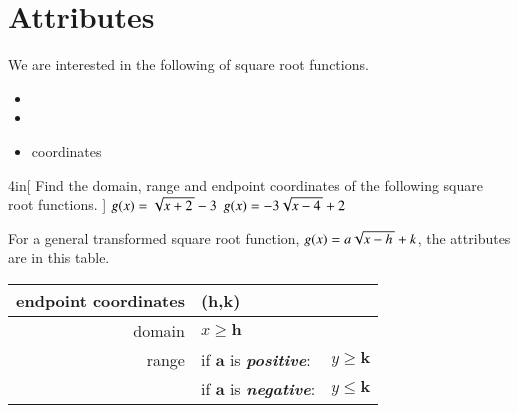 \section{Attributes}

We are interested in the following  of square root functions.
\begin{itemize}[nosep]
    \item {}
    \item {}
    \item {} coordinates
\end{itemize}

\begin{my2Problems}[\normalsize]{4in}[
    Find the domain, range and endpoint coordinates of the 
    following square root functions.
    ]
    {
        $g(x) = \myRoot{x+2} - 3$
    }
    {
        $g(x) = - 3 \myRoot{x-4} + 2$
    }
\end{my2Problems}

For a general transformed square root function,
$g(x) = a \myRoot{x-h} + k$, 
the attributes 
are in this table.

\begin{myCenteredBox}[width=5.25in,]
\Large
\begin{center}
\begin{tabular}{r||lc}
    endpoint coordinates & (${\boldsymbol h}$,${\boldsymbol k}$) &  \\
    \midrule
    domain               & $x \geq {\boldsymbol h}$ &  \\
    \midrule
    range                & if ${\boldsymbol a}$ is {\bfseries\itshape positive}: & $y \geq {\boldsymbol k}$ \\
                         & if ${\boldsymbol a}$ is {\bfseries\itshape negative}: & $y \leq {\boldsymbol k}$ \\
\end{tabular}
\end{center}
\end{myCenteredBox}